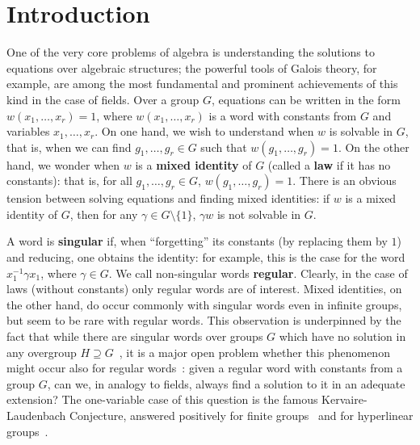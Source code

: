 \documentclass{article}
\theoremstyle{remark}
\theoremstyle{definition}
\begin{document}
%
%
\section{Introduction}\label{sect:intro}

One of the very core problems of algebra is understanding the solutions to equations  over  algebraic structures; the powerful tools of Galois theory, for example, are among the most fundamental and prominent achievements %
 of this kind
in  the case of fields. Over a group $G$, equations can be written in  the form $w(x_1, \dots, x_r)=1$, where $w(x_1, \dots, x_r)$ is a word with constants from $G$ and variables $x_1, \dots, x_r$. 
On one hand, we %
wish to understand when $w$ is solvable in $G$, that is, when we can find $g_1, \dots, g_r\in G$ such that $w(g_1, \dots, g_r)=1$. On the other hand, we wonder 
when $w$ is a \textbf{mixed identity} of $G$ (called a \textbf{law} if it has no constants): that is, for all $g_1, \dots, g_r\in G$, $w(g_1, \dots, g_r)=1$. There is an obvious tension between solving equations and finding mixed identities: if $w$ is a mixed identity of $G$, then for any $\gamma\in G\setminus\{1\}$, $\gamma w$ is not solvable in $G$. %

A word is \textbf{singular} if, when ``forgetting'' its constants (by replacing them by $1$) and reducing,  one obtains the identity: for example, this is the case for the word $x_1^{-1}\gamma x_1$,  where $\gamma \in G$. We call non-singular words \textbf{regular}. Clearly, in the case of laws (without constants) only regular words are of interest.  Mixed identities, on the other hand,  do  occur commonly with singular words even in infinite groups, but seem to be rare with  regular words. This observation is underpinned by the fact that while there are singular words over groups $G$ which have no solution in any overgroup $H\supseteq G$~\cite[$\S$1]{klyachko2017new}, it is a major open problem whether this phenomenon might occur also for regular words~\cite[Conjecture 1.1]{klyachko2017new}: given a regular word with constants from a group $G$, can we, in analogy to fields, always find a solution to it in an adequate extension?
The one-variable case of this question is the famous Kervaire-Laudenbach Conjecture, answered positively for finite groups~\cite{gerstenhaber1962solution} and for hyperlinear groups~\cite{pestov2008hyperlinear}.
\end{document}
